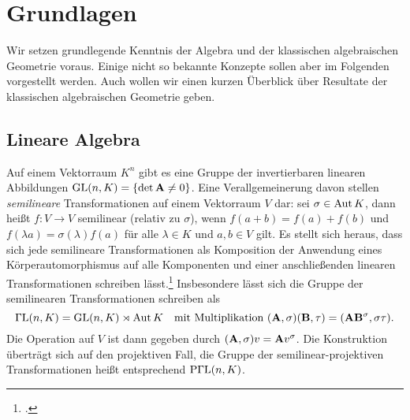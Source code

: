 \chapter{Grundlagen} \label{chap:prelim}
Wir setzen grundlegende Kenntnis der Algebra und der klassischen algebraischen Geometrie voraus. Einige nicht so bekannte Konzepte sollen aber im Folgenden vorgestellt werden. Auch wollen wir einen kurzen Überblick über Resultate der klassischen algebraischen Geometrie geben.

\section{Lineare Algebra}
Auf einem Vektorraum $K^n$ gibt es eine Gruppe der invertierbaren linearen Abbildungen $\mathrm{GL}(n,K) = \{\det \mathbf{A} \neq 0\}$. Eine Verallgemeinerung davon stellen \emph{semilineare} Transformationen auf einem Vektorraum $V$ dar: sei $\sigma \in \operatorname{Aut} K$, dann heißt $f: V \to V$ semilinear (relativ zu $\sigma$), wenn $f(a+b) = f(a) + f(b)$ und $f(\lambda a) = \sigma(\lambda)f(a)$ für alle $\lambda \in K$ und $a, b \in V$ gilt. Es stellt sich heraus, dass sich jede semilineare Transformationen als Komposition der Anwendung eines Körperautomorphismus auf alle Komponenten und einer anschließenden linearen Transformationen schreiben lässt.\footcite[Das folgt leicht aus den Bemerkungen in][S.~2--3]{Dieudonne} Insbesondere lässt sich die Gruppe der semilinearen Transformationen schreiben als
\begin{equation}
\mathrm{\Gamma L}(n,K) = \mathrm{GL}(n,K) \rtimes \operatorname{Aut} K \quad\text{mit Multiplikation } (\mathbf{A}, \sigma)(\mathbf{B}, \tau) = (\mathbf{A} \mathbf{B}^\sigma, \sigma \tau).
\end{equation}
Die Operation auf $V$ ist dann gegeben durch $(\mathbf{A}, \sigma)v = \mathbf{A} v^\sigma$. Die Konstruktion überträgt sich auf den projektiven Fall, die Gruppe der semilinear-projektiven Transformationen heißt entsprechend $\mathrm{P\Gamma L}(n,K)$.

